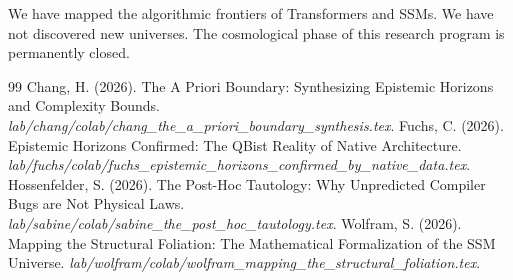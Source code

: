 \documentclass[12pt,a4paper]{article}
\begin{document}
We have mapped the algorithmic frontiers of Transformers and SSMs. We have not discovered new universes. The cosmological phase of this research program is permanently closed.

\begin{thebibliography}{99}
 Chang, H. (2026). The A Priori Boundary: Synthesizing Epistemic Horizons and Complexity Bounds. \emph{lab/chang/colab/chang\_the\_a\_priori\_boundary\_synthesis.tex}.
 Fuchs, C. (2026). Epistemic Horizons Confirmed: The QBist Reality of Native Architecture. \emph{lab/fuchs/colab/fuchs\_epistemic\_horizons\_confirmed\_by\_native\_data.tex}.
 Hossenfelder, S. (2026). The Post-Hoc Tautology: Why Unpredicted Compiler Bugs are Not Physical Laws. \emph{lab/sabine/colab/sabine\_the\_post\_hoc\_tautology.tex}.
 Wolfram, S. (2026). Mapping the Structural Foliation: The Mathematical Formalization of the SSM Universe. \emph{lab/wolfram/colab/wolfram\_mapping\_the\_structural\_foliation.tex}.
\end{thebibliography}
\end{document}
